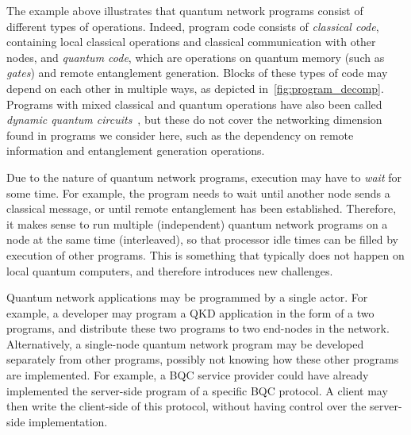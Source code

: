 The example above illustrates that quantum network programs consist of different
types of operations.
Indeed, program code consists of \textit{classical code}, containing local classical operations and classical communication with other nodes, and \textit{quantum code}, which are operations on quantum memory (such as \textit{gates}) and remote entanglement generation.
Blocks of these types of code may depend on each other in multiple ways, as depicted in~\cref{fig:program_decomp}.
Programs with mixed classical and quantum operations have also been called \textit{dynamic quantum circuits}~\cite{cross2021openqasm, burgholzer2021towards}, but these do not cover the networking dimension found in programs we consider here, such as the dependency on remote information and entanglement generation operations.

Due to the nature of quantum network programs, execution may have to \textit{wait} for some time. For example, the program needs to wait until another node sends a classical message, or until remote entanglement has been established.
Therefore, it makes sense to run multiple (independent) quantum network programs on a node at the same time (interleaved), so that processor idle times can be filled by execution of other programs. This is something that typically does not happen on local quantum computers, and therefore introduces new challenges.

Quantum network applications may be programmed by a single actor.
For example, a developer may program a QKD application in the form of a two programs, and distribute these two programs to two end-nodes in the network.
Alternatively, a single-node quantum network program may be developed separately from other programs, possibly not knowing how these other programs are implemented.
For example, a BQC service provider could have already implemented the server-side program of a specific BQC protocol.
A client may then write the client-side of this protocol, without having control over the server-side implementation.




